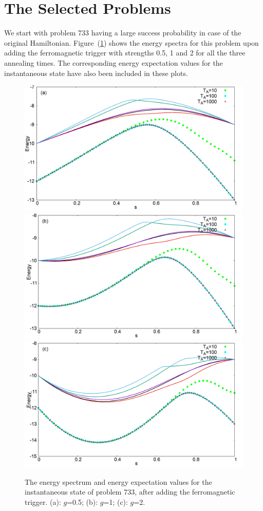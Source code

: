 \documentclass[../main.tex]{subfiles}
\begin{document}
\section{The Selected Problems}
We start with problem 733 having a large success probability in case of the original Hamiltonian. Figure~(\ref{fig:f1}) shows the energy spectra for this problem upon adding the ferromagnetic trigger with strengths 0.5, 1 and 2 for all the three annealing times. The corresponding  energy expectation values for the instantaneous state have also been included in these plots. 
\begin{figure}
\centering 
\includegraphics[scale=0.24]{733_s12_F_g0.png}
\includegraphics[scale=0.24]{733_s12_F_g1.png}
\includegraphics[scale=0.24]{733_s12_F_g2.png}

\caption{The energy spectrum and energy expectation values for the instantaneous state of problem 733, after adding the ferromagnetic trigger. (a): $g$=0.5; (b): $g$=1; (c): $g$=2. }
\label{fig:f1}
\end{figure}
\end{document}

